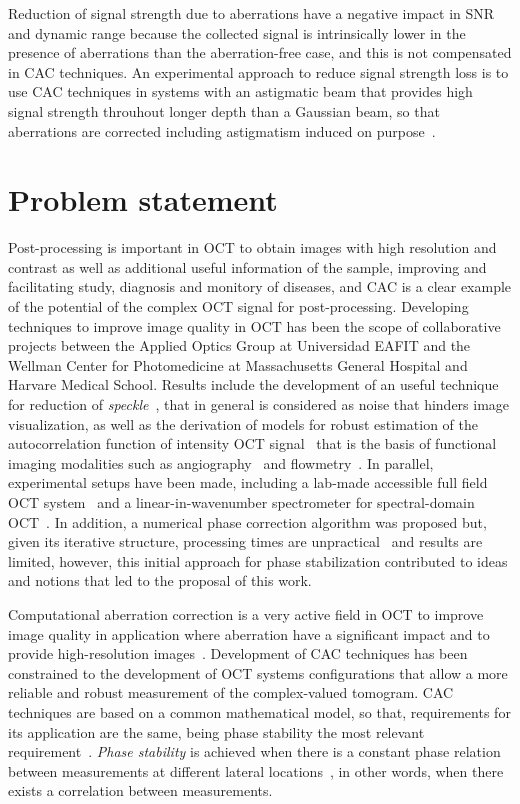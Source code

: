 Reduction of signal strength due to aberrations have a negative impact in SNR and dynamic range because the collected signal is intrinsically lower in the presence of aberrations than the aberration-free case, and this is not compensated in CAC techniques. An experimental approach to reduce signal strength loss is to use CAC techniques in systems with an astigmatic beam that provides high signal strength throuhout longer depth than a Gaussian beam, so that aberrations are corrected including astigmatism induced on purpose~\cite{Adie2012_Computational}.


\section{Problem statement}

Post-processing is important in OCT to obtain images with high resolution and contrast as well as additional useful information of the sample, improving and facilitating study, diagnosis and monitory of diseases, and CAC is a clear example of the potential of the complex OCT signal for post-processing. Developing techniques to improve image quality in OCT has been the scope of collaborative projects between the Applied Optics Group at Universidad EAFIT and the Wellman Center for Photomedicine at Massachusetts General Hospital and Harvare Medical School. Results include the development of an useful technique for reduction of \textit{speckle}~\cite{Cuartas-Velez2018_Volumetric}, that in general is considered as noise that hinders image visualization, as well as the derivation of models for robust estimation of the autocorrelation function of intensity OCT signal~\cite{Uribe-Patarroyo2020_noise} that is the basis of functional imaging modalities such as angiography~\cite{Wang2007_Three} and flowmetry~\cite{Liu2013_Quantitative}. In parallel, experimental setups have been made, including a lab-made accessible full field OCT system~\cite{Cuartas-Velez2019_Labmade} and a linear-in-wavenumber spectrometer for spectral-domain OCT~\cite{Ruiz-Lopera2018_Design}. In addition, a numerical phase correction algorithm was proposed but, given its iterative structure, processing times are unpractical~\cite{Cuartas-Velez2017_Formacion} and results are limited, however, this initial approach for phase stabilization contributed to ideas and notions that led to the proposal of this work. 

Computational aberration correction is a very active field in OCT to improve image quality in application where aberration have a significant impact and to provide high-resolution images~\cite{Adie2012_Computational, Hillmann2016_Aberrationfree, Kumar2017_Invivo}. Development of CAC techniques has been constrained to the development of OCT systems configurations that allow a more reliable and robust measurement of the complex-valued tomogram. CAC techniques are based on a common mathematical model, so that, requirements for its application are the same, being phase stability the most relevant requirement~\cite{Shemonski2014_Stability}. \textit{Phase stability} is achieved when there is a constant phase relation between measurements at different lateral locations~\cite{Shemonski2014_Stability}, in other words, when there exists a correlation between measurements.

